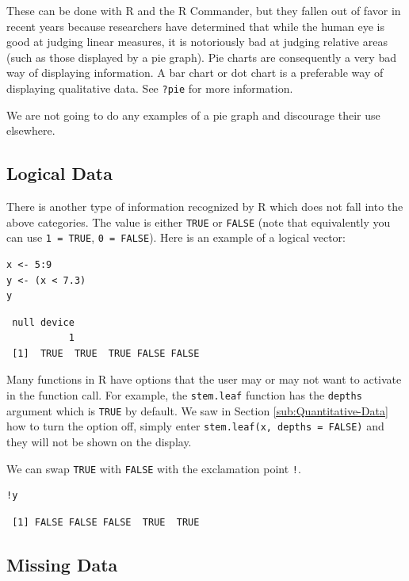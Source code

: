 \documentclass[captions=tableheading]{scrbook}
\begin{document}
These can be done with \textsf{R} and the \textsf{R} Commander, but they fallen out of favor in recent years because researchers have determined that while the human eye is good at judging linear measures, it is notoriously bad at judging relative areas (such as those displayed by a pie graph). Pie charts are consequently a very bad way of displaying information. A bar chart or dot chart is a preferable way of displaying qualitative data. See \texttt{?pie} for more information.

We are not going to do any examples of a pie graph and discourage their use elsewhere. 
\subsection{Logical Data}
\label{sec-3-1-5}

\label{sub:Logical-Data}

There is another type of information recognized by \textsf{R} which does not fall into the above categories. The value is either \texttt{TRUE} or \texttt{FALSE} (note that equivalently you can use \texttt{1 = TRUE}, \texttt{0 = FALSE}). Here is an example of a logical vector:


\begin{verbatim}
x <- 5:9
y <- (x < 7.3)
y
\end{verbatim}

\begin{verbatim}
 null device 
           1
 [1]  TRUE  TRUE  TRUE FALSE FALSE
\end{verbatim}

Many functions in \textsf{R} have options that the user may or may not want to activate in the function call. For example, the \texttt{stem.leaf} function has the \texttt{depths} argument which is \texttt{TRUE} by default. We saw in Section \ref{sub:Quantitative-Data} how to turn the option off, simply enter \texttt{stem.leaf(x, depths = FALSE)} and they will not be shown on the display.

We can swap \texttt{TRUE} with \texttt{FALSE} with the exclamation point \texttt{!}.


\begin{verbatim}
!y
\end{verbatim}

\begin{verbatim}
 [1] FALSE FALSE FALSE  TRUE  TRUE
\end{verbatim}
\subsection{Missing Data}
\label{sec-3-1-6}
\end{document}
